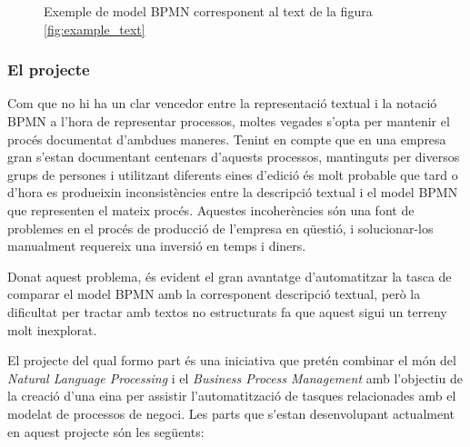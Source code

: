 \documentclass[10pt,a4paper]{article}
\begin{document}
\begin{figure}
    \begin{center}
    \end{center}
    \caption{Exemple de model BPMN corresponent al text de la figura \ref{fig:example_text}}
    \label{fig:example_bpmn}
\end{figure}

\subsubsection{El projecte}
\label{el_projecte}

Com que no hi ha un clar vencedor entre la representació textual i la notació BPMN a l'hora de representar processos, moltes vegades s'opta per mantenir el procés documentat d'ambdues maneres. Tenint en compte que en una empresa gran s'estan documentant centenars d'aquests processos, mantinguts per diversos grups de persones i utilitzant diferents eines d'edició és molt probable que tard o d'hora es produeixin inconsistències entre la descripció textual i el model BPMN que representen el mateix procés. Aquestes incoherències són una font de problemes en el procés de producció de l'empresa en qüestió, i solucionar-los manualment requereix una inversió en temps i diners.

Donat aquest problema, és evident el gran avantatge d'automatitzar la tasca de comparar el model BPMN amb la corresponent descripció textual, però la dificultat per tractar amb textos no estructurats fa que aquest sigui un terreny molt inexplorat. 

El projecte del qual formo part és una iniciativa que pretén combinar el món del \emph{Natural Language Processing} i el \emph{Business Process Management} amb l'objectiu de la creació d'una eina per assistir l'automatització de tasques relacionades amb el modelat de processos de negoci. Les parts que s'estan desenvolupant actualment en aquest projecte són les següents:
\end{document}
